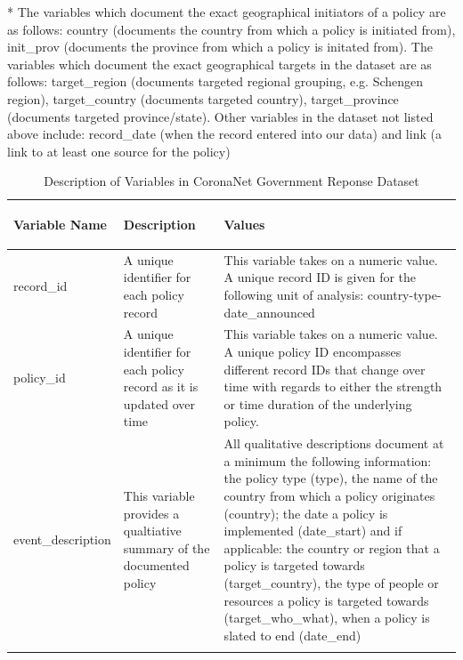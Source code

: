 \documentclass[]{article}
\begin{document}
\begingroup\fontsize{10}{12}\selectfont

\begin{ThreePartTable}
\begin{TableNotes}[para]
\small
\item[*] The variables which document the exact geographical initiators of a policy are as follows:  country (documents the country from which a policy is initiated from), init\_prov (documents the province from which a policy is initated from). The variables which document the exact geographical targets in the dataset are as follows: target\_region (documents targeted regional grouping, e.g. Schengen region), target\_country (documents targeted country), target\_province (documents targeted province/state). Other variables in the dataset not listed above include: record\_date (when the record entered into our data) and link (a link to at least one source for the policy)
\end{TableNotes}
\begin{longtable}{>{\bfseries\raggedright\arraybackslash}p{3.5cm}>{\raggedright\arraybackslash}p{5cm}>{\raggedright\arraybackslash}p{8.5cm}}
\caption{\label{tab:vardesc}Description of Variables in CoronaNet Government Reponse Dataset}\\
\toprule
\textbf{Variable Name} & \textbf{Description} & \textbf{Values}\\
\midrule
\rowcolor{gray!6}  record\_id & A unique identifier for each policy record & This variable takes on a numeric value. A unique record ID is given for the following unit of analysis: country-type-date\_announced\\
policy\_id & A unique identifier for each policy record as it is updated over time & This variable takes on a numeric value. A unique policy ID encompasses different record IDs that change over time with regards to either the strength or time duration of the underlying policy.\\
\rowcolor{gray!6}  event\_description & This variable provides a qualtiative summary of the documented policy & All qualitative descriptions document at a minimum the following information: the policy type (type), the name of the country from which a policy originates (country); the date a policy is implemented (date\_start) and if applicable:  the country or region that a policy is targeted towards (target\_country), the type of people or resources a policy is targeted towards (target\_who\_what), when a policy is slated to end (date\_end)\\
\addlinespace[0.3em]

\end{longtable}
\end{ThreePartTable}
\end{document}

